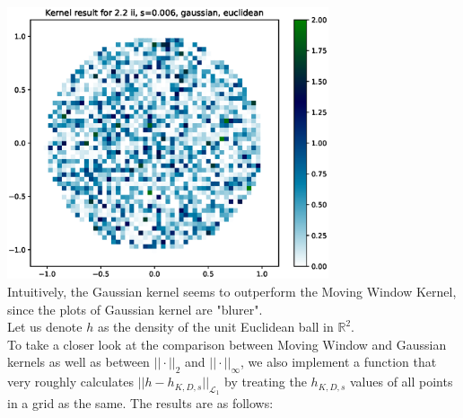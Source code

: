 \documentclass{article}
\begin{document}
\includegraphics[height=8cm]{comparisons//Kernel_result_2-2ii_s_0-006_gaussian_euclidean.eps}  \\
Intuitively, the Gaussian kernel seems to outperform the Moving Window Kernel, since the plots of Gaussian kernel are "blurer". \vspace*{0.8em}\\
Let us denote $h$ as the density of the unit Euclidean ball in $\mathbb{R}^2$. \\
To take a closer look at the comparison between Moving Window and Gaussian kernels as well as between $||\cdot ||_2$ and $||\cdot ||_{\infty}$, we also implement a function that very roughly calculates $||h-h_{K,D,s}||_{\mathcal{L}_1}$ by treating the $h_{K,D,s}$ values of all points in a grid as the same. The results are as follows: \vspace*{-0.6cm}\\
\end{document}
